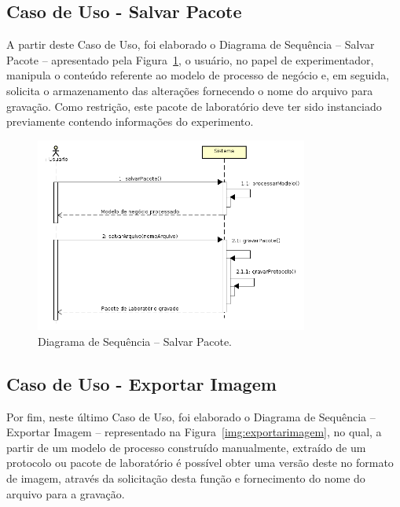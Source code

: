 \subsection{Caso de Uso - Salvar Pacote}

A partir deste Caso de Uso, foi elaborado o Diagrama de Sequência -- Salvar Pacote -- apresentado pela Figura~\ref{img:salvarpacote}, o usuário, no papel de experimentador, manipula o conteúdo referente ao modelo de processo de negócio e, em seguida, solicita o armazenamento das alterações fornecendo o nome do arquivo para gravação. Como restrição, este pacote de laboratório deve ter sido instanciado previamente contendo informações do experimento.

\begin{figure}[!htb]
\centering
\includegraphics[width=0.8\textwidth]{images/salvarpacote.png}
\caption{Diagrama de Sequência -- Salvar Pacote.}
\label{img:salvarpacote}
\end{figure}


\subsection{Caso de Uso - Exportar Imagem}

Por fim, neste último Caso de Uso, foi elaborado o Diagrama de Sequência -- Exportar Imagem -- representado na Figura~\ref{img:exportarimagem}, no qual, a partir de um modelo de processo construído manualmente, extraído de um protocolo ou pacote de laboratório é possível obter uma versão deste no formato de imagem, através da solicitação desta função e fornecimento do nome do arquivo para a gravação.

